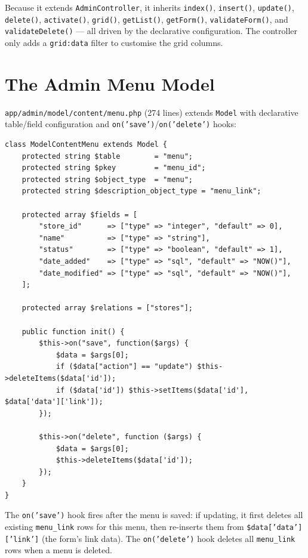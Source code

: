 \documentclass[11pt,a4paper]{article}
\begin{document}
Because it extends \texttt{AdminController}, it inherits
\texttt{index()}, \texttt{insert()}, \texttt{update()},
\texttt{delete()}, \texttt{activate()}, \texttt{grid()},
\texttt{getList()}, \texttt{getForm()}, \texttt{validateForm()}, and
\texttt{validateDelete()} --- all driven by the declarative
configuration. The controller only adds a \texttt{grid:data} filter
to customise the grid columns.

\section{The Admin Menu Model}\label{sec:admin-model}

\texttt{app/admin/model/content/menu.php} (274 lines) extends
\texttt{Model} with declarative table/field configuration and
\texttt{on('save')}/\texttt{on('delete')} hooks:

\begin{lstlisting}[caption={\texttt{ModelContentMenu} --- declarative model with save/delete hooks.},label={lst:menu-model}]
class ModelContentMenu extends Model {
    protected string $table        = "menu";
    protected string $pkey         = "menu_id";
    protected string $object_type  = "menu";
    protected string $description_object_type = "menu_link";

    protected array $fields = [
        "store_id"      => ["type" => "integer", "default" => 0],
        "name"          => ["type" => "string"],
        "status"        => ["type" => "boolean", "default" => 1],
        "date_added"    => ["type" => "sql", "default" => "NOW()"],
        "date_modified" => ["type" => "sql", "default" => "NOW()"],
    ];

    protected array $relations = ["stores"];

    public function init() {
        $this->on("save", function($args) {
            $data = $args[0];
            if ($data["action"] == "update") $this->deleteItems($data['id']);
            if ($data['id']) $this->setItems($data['id'], $data['data']['link']);
        });

        $this->on("delete", function ($args) {
            $data = $args[0];
            $this->deleteItems($data['id']);
        });
    }
}
\end{lstlisting}

The \texttt{on('save')} hook fires after the menu is saved: if
updating, it first deletes all existing \texttt{menu\_link} rows for
this menu, then re-inserts them from \texttt{\$data['data']['link']}
(the form's link data). The \texttt{on('delete')} hook deletes all
\texttt{menu\_link} rows when a menu is deleted.
\end{document}
